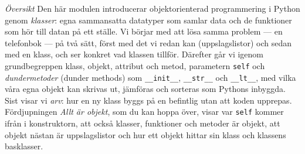 \emph{Översikt}
Den här modulen introducerar objektorienterad programmering i Python genom
\emph{klasser}: egna sammansatta datatyper som samlar data och de
funktioner som hör till datan på ett ställe.  Vi börjar med att lösa
samma problem --- en telefonbok --- på två sätt, först med det vi redan
kan (uppslagslistor) och sedan med en klass, och ser konkret vad klassen
tillför.  Därefter går vi igenom grundbegreppen klass, objekt, attribut
och metod, parametern \texttt{self} och \emph{dundermetoder}
(\foreignlanguage{english}{dunder methods}) som \texttt{__init__},
\texttt{__str__} och \texttt{__lt__}, med vilka
våra egna objekt kan skrivas ut, jämföras och sorteras som Pythons
inbyggda.  Sist visar vi \emph{arv}: hur en ny klass byggs på en
befintlig utan att koden upprepas.  Fördjupningen \emph{Allt är objekt},
som du kan hoppa över, visar var \texttt{self} kommer ifrån
i konstruktorn, att också klasser, funktioner och metoder är objekt, att
objekt nästan är uppslagslistor och hur ett objekt hittar sin klass och
klassens basklasser.


